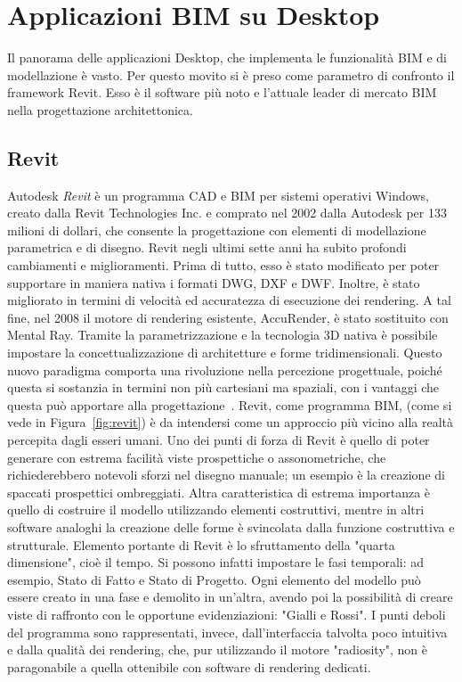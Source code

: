 \section{Applicazioni BIM su Desktop}
\label{sec:chapter_1_section_2}
Il panorama delle applicazioni Desktop, che implementa le funzionalità BIM e di modellazione è vasto. Per questo movito si è
preso come parametro di confronto il framework Revit. Esso è il software più noto e l’attuale leader di mercato BIM nella
progettazione architettonica.

\subsection*{Revit}
\label{sec:chapter_1_section_2_sub_1}
Autodesk \emph{Revit} è un programma CAD e BIM per sistemi operativi Windows, creato dalla Revit Technologies Inc. e comprato
nel 2002 dalla Autodesk per 133 milioni di dollari, che consente la progettazione con elementi di modellazione parametrica
e di disegno.
Revit negli ultimi sette anni ha subito profondi cambiamenti e miglioramenti. Prima di tutto, esso è stato modificato per poter
supportare in maniera nativa i formati DWG, DXF e DWF. Inoltre, è stato migliorato in termini di velocità ed accuratezza di
esecuzione dei rendering. A tal fine, nel 2008 il motore di rendering esistente, AccuRender, è stato sostituito con Mental Ray.
Tramite la parametrizzazione e la tecnologia 3D nativa è possibile impostare la concettualizzazione di architetture e forme
tridimensionali. Questo nuovo paradigma comporta una rivoluzione nella percezione progettuale, poiché questa si sostanzia in
termini non più cartesiani ma spaziali, con i vantaggi che questa può apportare alla progettazione~\cite{BIMrevolution}.
Revit, come programma BIM, (come si vede in Figura~\ref{fig:revit}) è da intendersi come un approccio più vicino alla realtà
percepita dagli esseri umani.
Uno dei punti di forza di Revit è quello di poter generare con estrema facilità viste prospettiche o assonometriche, che
richiederebbero notevoli sforzi nel disegno manuale; un esempio è la creazione di spaccati prospettici ombreggiati.
Altra caratteristica di estrema importanza è quello di costruire il modello utilizzando elementi costruttivi, mentre
in altri software analoghi la creazione delle forme è svincolata dalla funzione costruttiva e strutturale.
Elemento portante di Revit è lo sfruttamento della "quarta dimensione", cioè il tempo. Si possono infatti impostare le fasi
temporali: ad esempio, Stato di Fatto e Stato di Progetto. Ogni elemento del modello può essere creato in una fase e demolito
in un'altra, avendo poi la possibilità di creare viste di raffronto con le opportune evidenziazioni: "Gialli e Rossi".
I punti deboli del programma sono rappresentati, invece, dall'interfaccia talvolta poco intuitiva e dalla qualità dei rendering,
che, pur utilizzando il motore "radiosity", non è paragonabile a quella ottenibile con software di rendering dedicati.\\

